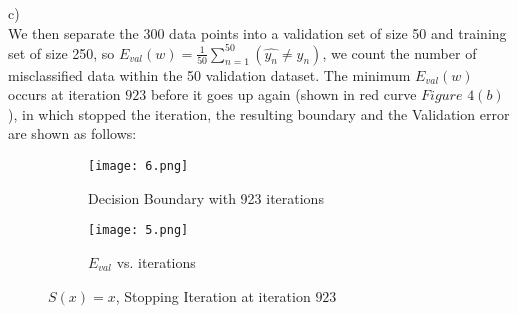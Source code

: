 \documentclass[12pt]{article}
\newcommand{\D}{\displaystyle}
\begin{document}
c)\\
\indent We then separate the 300 data points into a validation set of size 50 and training set of size 250, so $\D E_{val}(w) = \frac{1}{50}\sum_{n=1}^{50}(\hat{y_n} \neq y_n)$, we count the number of misclassified data within the 50 validation dataset. The minimum $E_{val}(w)$ occurs at iteration $923$ before it goes up again (shown in red curve $Figure$ $4(b)$), in which stopped the iteration, the resulting boundary and the Validation error are shown as follows:
\begin{figure}[H]
\centering
\begin{subfigure}{.5\textwidth}
  \centering
   \texttt{[image: 6.png]}
  \caption{Decision Boundary with 923 iterations}
  \label{fig:1}
\end{subfigure}%
\begin{subfigure}{.5\textwidth}
  \centering
   \texttt{[image: 5.png]}
  \caption{$E_{val}$ vs. iterations}
  \label{fig:2}
\end{subfigure}
\caption{$S(x) = x$, Stopping Iteration at iteration $923$}
\label{fig:test}
\end{figure}\indent\\
\end{document}
